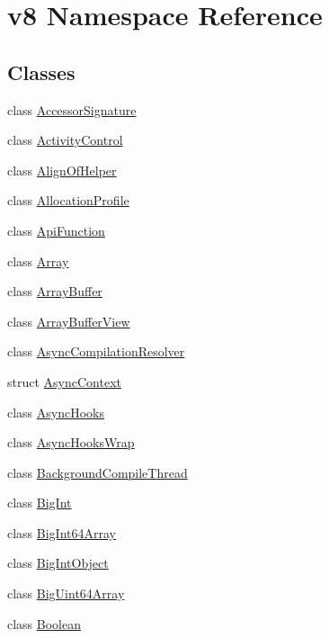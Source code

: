 \hypertarget{namespacev8}{}\section{v8 Namespace Reference}
\label{namespacev8}
\subsection*{Classes}
\begin{DoxyCompactItemize}
\item 
class \mbox{\hyperlink{classv8_1_1AccessorSignature}{Accessor\+Signature}}
\item 
class \mbox{\hyperlink{classv8_1_1ActivityControl}{Activity\+Control}}
\item 
class \mbox{\hyperlink{classv8_1_1AlignOfHelper}{Align\+Of\+Helper}}
\item 
class \mbox{\hyperlink{classv8_1_1AllocationProfile}{Allocation\+Profile}}
\item 
class \mbox{\hyperlink{classv8_1_1ApiFunction}{Api\+Function}}
\item 
class \mbox{\hyperlink{classv8_1_1Array}{Array}}
\item 
class \mbox{\hyperlink{classv8_1_1ArrayBuffer}{Array\+Buffer}}
\item 
class \mbox{\hyperlink{classv8_1_1ArrayBufferView}{Array\+Buffer\+View}}
\item 
class \mbox{\hyperlink{classv8_1_1AsyncCompilationResolver}{Async\+Compilation\+Resolver}}
\item 
struct \mbox{\hyperlink{structv8_1_1AsyncContext}{Async\+Context}}
\item 
class \mbox{\hyperlink{classv8_1_1AsyncHooks}{Async\+Hooks}}
\item 
class \mbox{\hyperlink{classv8_1_1AsyncHooksWrap}{Async\+Hooks\+Wrap}}
\item 
class \mbox{\hyperlink{classv8_1_1BackgroundCompileThread}{Background\+Compile\+Thread}}
\item 
class \mbox{\hyperlink{classv8_1_1BigInt}{Big\+Int}}
\item 
class \mbox{\hyperlink{classv8_1_1BigInt64Array}{Big\+Int64\+Array}}
\item 
class \mbox{\hyperlink{classv8_1_1BigIntObject}{Big\+Int\+Object}}
\item 
class \mbox{\hyperlink{classv8_1_1BigUint64Array}{Big\+Uint64\+Array}}
\item 
class \mbox{\hyperlink{classv8_1_1Boolean}{Boolean}}
\item 

\end{DoxyCompactItemize}
